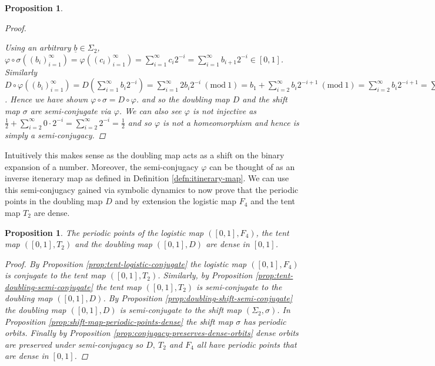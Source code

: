 \documentclass[11pt,a4paper,oneside]{memoir}
\theoremstyle{plain}
\newtheorem{prop}[thm]{Proposition}
\theoremstyle{definition}
\newcommand{\mmod}[1]{\ (\mathrm{mod}\ #1)}
\begin{document}
\begin{prop}
\begin{proof}
\begin{center}
        \end{center}
        Using an arbitrary $\underline{b} \in \Sigma_2$, $\varphi \circ \sigma\left((b_i)_{i=1}^{\infty}\right) = \varphi\left((c_i)_{i=1}^{\infty}\right) = \sum_{i=1}^{\infty} c_i2^{-i} = \sum_{i=1}^{\infty} b_{i+1}2^{-i} \in [0, 1]$. Similarly $D \circ \varphi\left((b_i)_{i=1}^{\infty}\right) = D\left(\sum_{i=1}^{\infty} b_i2^{-i}\right) = \sum_{i=1}^{\infty} 2b_i2^{-i} \mmod 1 = b_1 + \sum_{i=2}^{\infty} b_i2^{-i+1} \mmod 1 = \sum_{i=2}^{\infty} b_i2^{-i+1} = \sum_{j=1}^{\infty} b_{j+1}2^{-j} \in [0, 1]$. Hence we have shown $\varphi \circ \sigma = D \circ \varphi$. and so the doubling map $D$ and the shift map $\sigma$ are semi-conjugate via $\varphi$. We can also see $\varphi$ is not injective as $\frac{1}{2} + \sum_{i=2}^{\infty}0 \cdot 2^{-i} = \sum_{i=2}^{\infty}2^{-i} = \frac{1}{2}$ and so $\varphi$ is not a homeomorphism and hence is simply a semi-conjugacy. 
    \end{proof}
\end{prop}

Intuitively this makes sense as the doubling map acts as a shift on the binary expansion of a number. Moreover, the semi-conjugacy $\varphi$ can be thought of as an inverse itenerary map as defined in Definition \ref{defn:itinerary-map}. We can use this semi-conjugacy gained via symbolic dynamics to now prove that the periodic points in the doubling map $D$ and by extension the logistic map $F_4$ and the tent map $T_2$ are dense.

\begin{prop} \label{prop:logisitc-tent-doubling-periodic-dense}
    The periodic points of the logistic map $([0, 1], F_4)$, the tent map $([0, 1], T_2)$ and the doubling map $([0, 1], D)$ are dense in $[0, 1]$.
    \begin{proof}
    By Proposition \ref{prop:tent-logistic-conjugate} the logistic map $([0, 1], F_4)$ is conjugate to the tent map $([0, 1], T_2)$. Similarly, by Proposition \ref{prop:tent-doubling-semi-conjugate} the tent map $([0, 1], T_2)$ is semi-conjugate to the doubling map $([0, 1], D)$. By Proposition \ref{prop:doubling-shift-semi-conjugate} the doubling map $([0, 1], D)$ is semi-conjugate to the shift map $(\Sigma_2, \sigma)$. In Proposition \ref{prop:shift-map-periodic-points-dense} the shift map $\sigma$ has periodic orbits. Finally by Proposition \ref{prop:conjugacy-preserves-dense-orbits} dense orbits are preserved under semi-conjugacy so $D, \ T_2$ and $F_4$ all have periodic points that are dense in $[0, 1]$.
    \end{proof}
\end{prop}
\end{document}
